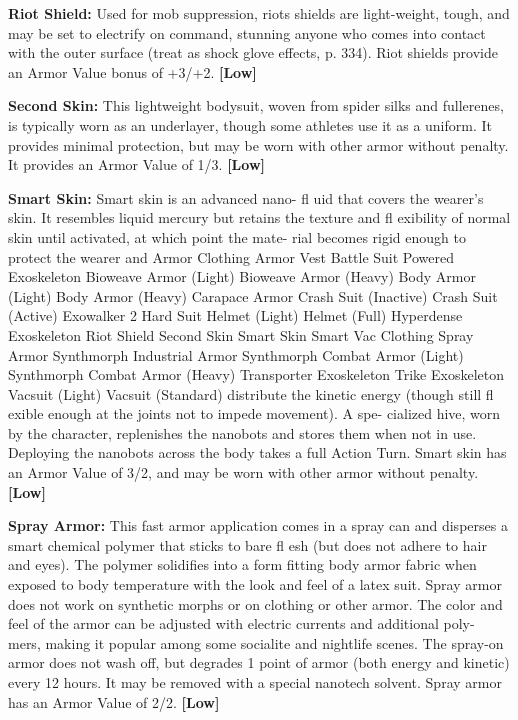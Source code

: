 \textbf{Riot Shield:} Used for mob suppression, riots shields 
are light-weight, tough, and may be set to electrify on 
command, stunning anyone who comes into contact 
with the outer surface (treat as shock glove effects, p. 
334). Riot shields provide an Armor Value bonus of 
+3/+2. \textbf{[Low]}

\textbf{Second Skin:} This lightweight bodysuit, woven 
from spider silks and fullerenes, is typically worn 
as an underlayer, though some athletes use it as a 
uniform. It provides minimal protection, but may be 
worn with other armor without penalty. It provides an 
Armor Value of 1/3. \textbf{[Low]}

\textbf{Smart Skin:} Smart skin is an advanced nano-
fl uid that covers the wearer's skin. It resembles liquid 
mercury but retains the texture and fl exibility  of 
normal skin until activated, at which point the mate-
rial becomes rigid enough to protect the wearer and 
Armor Clothing 
Armor Vest 
Battle Suit Powered Exoskeleton 
Bioweave Armor (Light) 
Bioweave Armor (Heavy) 
Body Armor (Light) 
Body Armor (Heavy) 
Carapace Armor  
Crash Suit (Inactive) 
Crash Suit (Active) 
Exowalker 2
Hard Suit 
Helmet (Light) 
Helmet (Full) 
Hyperdense Exoskeleton 
Riot Shield 
Second Skin 
Smart Skin 
Smart Vac Clothing
Spray Armor 
Synthmorph Industrial Armor  
Synthmorph Combat Armor (Light) 
Synthmorph Combat Armor (Heavy) 
Transporter Exoskeleton 
Trike Exoskeleton 
Vacsuit (Light)  
Vacsuit (Standard)  
distribute the kinetic energy (though still fl exible 
enough at the joints not to impede movement). A spe-
cialized hive, worn by the character, replenishes the 
nanobots and stores them when not in use. Deploying 
the nanobots across the body takes a full Action Turn. 
Smart skin has an Armor Value of 3/2, and may be 
worn with other armor without penalty. \textbf{[Low]}

\textbf{Spray Armor:} This fast armor application comes in 
a spray can and disperses a smart chemical polymer 
that sticks to bare fl esh (but does not adhere to hair 
and eyes). The polymer solidifies into a form fitting 
body armor fabric when exposed to body temperature 
with the look and feel of a latex suit. Spray armor 
does not work on synthetic morphs or on clothing or 
other armor. The color and feel of the armor can be 
adjusted with electric currents and additional poly-
mers, making it popular among some socialite and 
nightlife scenes. The spray-on armor does not wash 
off, but degrades 1 point of armor (both energy and 
kinetic) every 12 hours. It may be removed with a 
special nanotech solvent. Spray armor has an Armor 
Value of 2/2. \textbf{[Low]}


